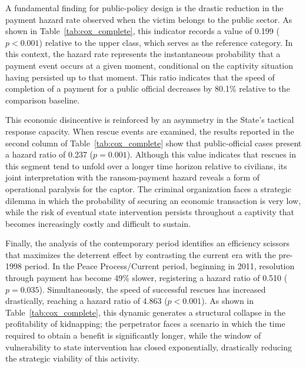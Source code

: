 \documentclass[12pt,a4paper]{article}
\theoremstyle{plain}
\theoremstyle{definition}
\theoremstyle{remark}
\newcommand{\1}{\mathbf{1}}
\begin{document}
A fundamental finding for public-policy design is the drastic reduction in the payment hazard rate observed when the victim belongs to the public sector. As shown in Table~\ref{tab:cox_complete}, this indicator records a value of 0.199 (\(p<0.001\)) relative to the upper class, which serves as the reference category. In this context, the hazard rate represents the instantaneous probability that a payment event occurs at a given moment, conditional on the captivity situation having persisted up to that moment. This ratio indicates that the speed of completion of a payment for a public official decreases by 80.1\% relative to the comparison baseline.

This economic disincentive is reinforced by an asymmetry in the State's tactical response capacity. When rescue events are examined, the results reported in the second column of Table~\ref{tab:cox_complete} show that public-official cases present a hazard ratio of 0.237 (\(p=0.001\)). Although this value indicates that rescues in this segment tend to unfold over a longer time horizon relative to civilians, its joint interpretation with the ransom-payment hazard reveals a form of operational paralysis for the captor. The criminal organization faces a strategic dilemma in which the probability of securing an economic transaction is very low, while the risk of eventual state intervention persists throughout a captivity that becomes increasingly costly and difficult to sustain.

Finally, the analysis of the contemporary period identifies an efficiency scissors that maximizes the deterrent effect by contrasting the current era with the pre-1998 period. In the Peace Process/Current period, beginning in 2011, resolution through payment has become 49\% slower, registering a hazard ratio of 0.510 (\(p=0.035\)). Simultaneously, the speed of successful rescues has increased drastically, reaching a hazard ratio of 4.863 (\(p<0.001\)). As shown in Table~\ref{tab:cox_complete}, this dynamic generates a structural collapse in the profitability of kidnapping; the perpetrator faces a scenario in which the time required to obtain a benefit is significantly longer, while the window of vulnerability to state intervention has closed exponentially, drastically reducing the strategic viability of this activity.
\end{document}
